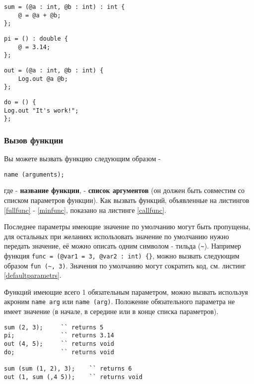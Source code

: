 \begin{lstlisting}[caption=Полноценная функция, label=fullfunc]
sum = (@a : int, @b : int) : int {
	@ = @a + @b;
};
\end{lstlisting}

\begin{lstlisting}[caption=Функция без аргументов, label=noargsfunc]
pi = () : double {
	@ = 3.14;
};
\end{lstlisting}

\begin{lstlisting}[caption=Функция без типа возвращаемой значений, label=notypefunc]
out = (@a : int, @b : int) {
	Log.out @a @b;
};
\end{lstlisting}

\begin{lstlisting}[caption=Функция без аргументов и тип возвращаемой значений, label=minfunc]
do = () {
Log.out "It's work!";
};
\end{lstlisting}

\subsubsection{Вызов функции}

Вы можете вызвать функцию следующим образом -
\begin{lstlisting}[numbers=none]
name (arguments);
\end{lstlisting}
где  - {\bf название функции},  - {\bf список аргументов} (он должен быть совместим со списком параметров функции). Как вызвать функций, объявленные на листингов \ref{fullfunc} - \ref{minfunc}, показано на листинге \ref{callfunc}. 

Последнее параметры имеющие значение по умолчанию могут быть пропущены, для остальных при желаниях использовать значение по умолчанию нужно передать \void{} значение, её можно описать одним символом - тильда (\lstinline|~|). Например функция \lstinline|func = (@var1 = 3, @var2 : int) {}|, можно вызвать следующим образом \lstinline|fun (~, 3)|. Значения по умолчанию могут сократить код, см. листинг \ref{defaultparametrs}.

Функций имеющие всего 1 обязательным параметром, можно вызвать используя акроним \lstinline|name arg| или \lstinline|name (arg)|. Положение обязательного параметра не имеет значение (в начале, в середине или в конце списка параметров).

\begin{lstlisting}[caption=Вызов функций, label=callfunc]
sum (2, 3); 	`` returns 5
pi;				`` returns 3.14
out (4, 5); 	`` returns void
do;				`` returns void

sum (sum (1, 2), 3);	`` returns 6
out (1, sum (,4 5));	`` returns void
\end{lstlisting}

